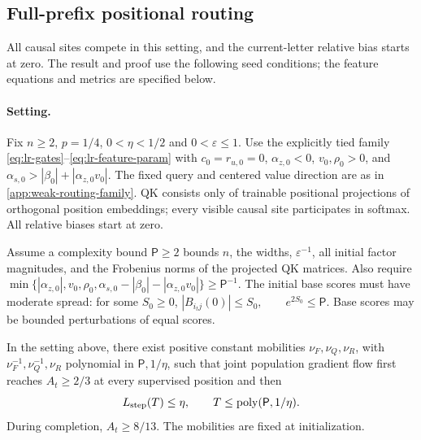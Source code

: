 \subsection{Full-prefix positional routing}
\label{app:weak-seeded-full-prefix-routing}

All causal sites compete in this setting, and the current-letter relative bias
starts at zero. The result and proof use the following seed conditions; the
feature equations and metrics are specified below.



\paragraph{Setting.}\label{app:lr-setting}
Fix $n\ge2$, $p=1/4$, $0<\eta<1/2$ and $0<\varepsilon\le1$.
Use the explicitly tied family \eqref{eq:lr-gates}--\eqref{eq:lr-feature-param}
with $c_0=r_{u,0}=0$, $\alpha_{z,0}<0$, $v_0,\rho_0>0$, and
$\alpha_{s,0}>|\beta_0|+|\alpha_{z,0}v_0|$. The fixed query and centered value direction
are as in \cref{app:weak-routing-family}. QK consists only of trainable
positional projections of orthogonal position embeddings; every visible
causal site participates in softmax. All relative biases start at zero.

Assume a complexity bound $\mathsf P\ge2$ bounds $n$, the widths,
$\varepsilon^{-1}$, all initial factor magnitudes, and the Frobenius norms
of the projected QK matrices. Also require
 $\min\{|\alpha_{z,0}|,v_0,\rho_0,\alpha_{s,0}-|\beta_0|-|\alpha_{z,0}v_0|\}\ge \mathsf P^{-1}.$ 
The initial base scores must have moderate spread: for some $S_0\ge0$,
 $|B_{i_tj}(0)|\le S_0,\qquad e^{2S_0}\le \mathsf P.$ 
Base scores may be bounded perturbations of equal scores.

\begin{lrtheorem}
\label{thm:lr-conditional-bridge}
In the setting above, there exist positive constant mobilities
$\nu_F,\nu_Q,\nu_R$, with $\nu_F^{-1},\nu_Q^{-1},\nu_R$
polynomial in $\mathsf P,1/\eta$, such that joint population gradient flow first
reaches $A_t\ge2/3$ at every supervised position and then
\begin{equation}\label{eq:lr-finite-theorem}
 L_{\mathrm{step}}(T)\le\eta,\qquad T\le\operatorname{poly}(\mathsf P,1/\eta).
\end{equation}
During completion, $A_t\ge8/13$. The mobilities are fixed at initialization.
\end{lrtheorem}




